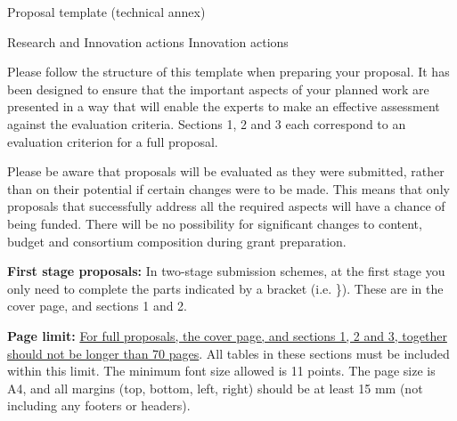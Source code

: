 \documentclass[noworkareas,deliverables,\classoptions]{euproposal}       %
\begin{document}
\phantom{ }

\begin{proposal}[
  site=PAR1,
  site=PAR2,
  site=PAR3,
  site=PAR4,
  botupPM, %
  coordinator=PAR1P1,
  coordinatorsite=PAR1,
  acronym={My-Prj-Acr},
  acrolong={My-Project-Acronym},
  title=My H2020 research project,
  callname=Call: Information and communication technologies,
  callid=Call identifier: H2020-ICT-2016-2017,
  keywords={science, research, ideas},
  instrument=Topic: Advanced robot capabilities research and take-up,
  challengeid =Challenge identifier: ICT-25-2016-2017,
  months=48,
  compactht]
\newcommand{\TheProject}{\pn}%

\begin{center}
Proposal template (technical annex)
\end{center}
\begin{center}
Research and Innovation actions Innovation actions
\end{center}

Please follow the structure of this template when preparing your proposal. It has been designed to ensure that the important aspects of your planned work are presented in a way that will enable the experts to make an effective assessment against the evaluation criteria. Sections 1, 2 and 3 each correspond to an evaluation criterion for a full proposal.

Please be aware that proposals will be evaluated as they were submitted, rather than on their potential if certain changes were to be made. This means that only proposals that successfully address all the required aspects will have a chance of being funded. There will be no possibility for significant changes to content, budget and consortium composition during grant preparation.

\textbf{First stage proposals:} In two-stage submission schemes, at the first stage you only need to complete the parts indicated by a bracket (i.e. \}). These are in the cover page, and sections 1 and 2.

\textbf{Page limit:} \uline{For full proposals, the cover page, and sections 1, 2 and 3, together should not be longer than 70 pages}. All tables in these sections must be included within this limit. The minimum font size allowed is 11 points. The page size is A4, and all margins (top, bottom, left, right) should be at least 15 mm (not including any footers or headers).


\end{proposal}
\end{document}
